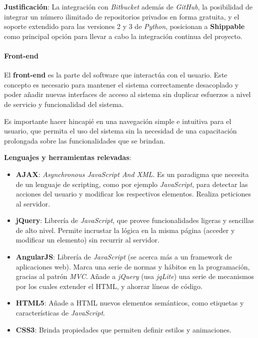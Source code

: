 \textbf{Justificación}:
La integración con \textit{Bitbucket} además de \textit{GitHub}, la posibilidad de integrar un número ilimitado de repositorios privados en forma gratuita, y el soporte extendido para las versiones 2 y 3 de \textit{Python}, posicionan a \textbf{Shippable} como principal opción para llevar a cabo la integración continua del proyecto.


\paragraph{Front-end}

El \textbf{front-end} es la parte del software que interactúa con el usuario.
Este concepto es necesario para mantener el sistema correctamente desacoplado y poder añadir nuevas interfaces de acceso al sistema sin duplicar esfuerzos a nivel de servicio y funcionalidad del sistema.

Es importante hacer hincapié en una navegación simple e intuitiva para el usuario, que permita el uso del sistema sin la necesidad de una capacitación prolongada sobre las funcionalidades que se brindan.


\textbf{Lenguajes y herramientas relevadas}:

\begin{itemize}
\item \textbf{AJAX}: 
\textit{Asynchronous JavaScript And XML}.
Es un paradigma que necesita de un lenguaje de scripting, como por ejemplo \textit{JavaScript}, para detectar las acciones del usuario y modificar los respectivos elementos.
Realiza peticiones al servidor. 

\item \textbf{jQuery}:
Librería de \textit{JavaScript}, que provee funcionalidades ligeras y sencillas de alto nivel.
Permite incrustar la lógica en la misma página (acceder y modificar un elemento) sin recurrir al servidor.

\item \textbf{AngularJS}:
Librería de \textit{JavaScript} (se acerca más a un framework de aplicaciones web).
Marca una serie de normas y hábitos en la programación, gracias al patrón \textit{MVC}.
Añade a \textit{jQuery} (usa \textit{jqLite}) una serie de mecanismos por los cuales extender el HTML, y ahorrar líneas de código.

\item \textbf{HTML5}:
Añade a HTML nuevos elementos semánticos, como etiquetas y características de \textit{JavaScript}.

\item \textbf{CSS3}:
Brinda propiedades que permiten definir estilos y animaciones.
\end{itemize}

